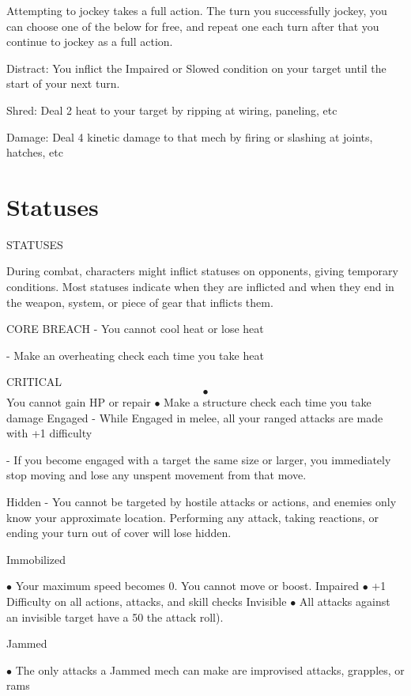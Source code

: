 Attempting to jockey takes a full action. The turn you successfully jockey, you can choose one of
the below for free, and repeat one each turn after that you continue to jockey as a full action.


Distract: You inflict the Impaired or Slowed condition on your target until the start of your next
turn.

Shred: Deal 2 heat to your target by ripping at wiring, paneling, etc

Damage: Deal 4 kinetic damage to that mech by firing or slashing at joints, hatches, etc

\chapter{Statuses}

  STATUSES

During combat, characters might inflict statuses on opponents, giving temporary conditions. Most
statuses indicate when they are inflicted and when they end in the weapon, system, or piece of
gear that inflicts them.

CORE BREACH
    -   You cannot cool heat or lose heat

    -   Make an overheating check each time you take heat

CRITICAL
    $$\bullet$$   You cannot gain HP or repair
    $\bullet$    Make a structure check each time you take damage
Engaged
    -   While Engaged in melee, all your ranged attacks are made with +1 difficulty

    -   If you become engaged with a target the same size or larger, you immediately stop
        moving and lose any unspent movement from that move.

Hidden
    -   You cannot be targeted by hostile attacks or actions, and enemies only know your
        approximate location. Performing any attack, taking reactions, or ending your turn out of
        cover will lose hidden.

Immobilized

    $\bullet$    Your maximum speed becomes 0. You cannot move or boost.
Impaired
    $\bullet$    +1 Difficulty on all actions, attacks, and skill checks
Invisible
    $\bullet$    All attacks against an invisible target have a 50%
        the attack roll).

Jammed

    $\bullet$    The only attacks a Jammed mech can make are improvised attacks, grapples, or rams

